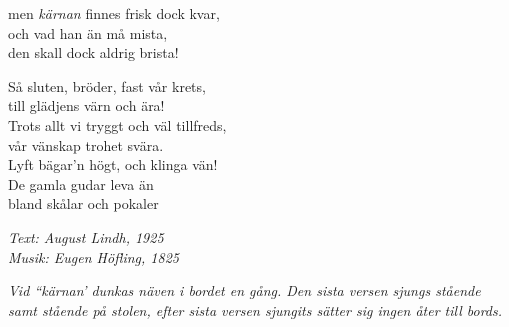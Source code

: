 men \textit{kärnan} finnes frisk dock kvar,\\
och vad han än må mista,\\
den skall dock aldrig brista!\par
\vspace{10pt}
Så sluten, bröder, fast vår krets,\\
till glädjens värn och ära!\\
Trots allt vi tryggt och väl tillfreds,\\
vår vänskap trohet svära.\\
Lyft bägar'n högt, och klinga vän!\\
De gamla gudar leva än\\
\revrpt bland skålar och pokaler\rpt\par
\vspace{10pt}
{\footnotesize\textit{Text: August Lindh, 1925\\ Musik:
Eugen Höfling, 1825}}\par
\vspace{10pt}
{\footnotesize\textit{Vid ``kärnan' dunkas näven i bordet en
gång. Den sista versen sjungs stående samt stående på stolen, efter
sista versen sjungits sätter sig ingen åter till bords.}}
